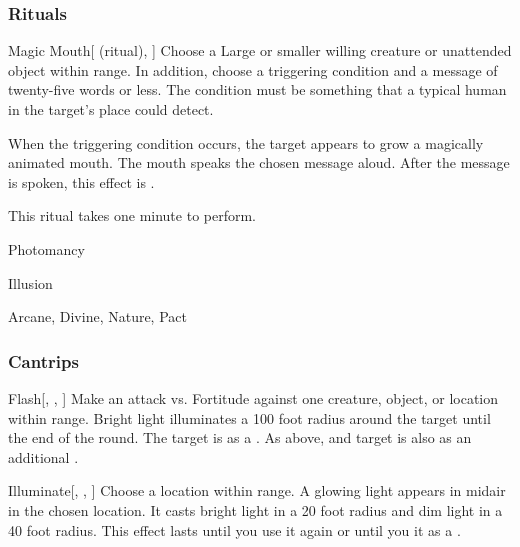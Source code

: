\subsubsection{Rituals}


\lowercase{\hypertarget{spell:Magic Mouth}{}}\label{spell:Magic Mouth}
\begin{attuneability}[\nth{1}]{\hypertarget{spell:Magic Mouth}{Magic Mouth}}[ (ritual), ]
Choose a Large or smaller willing creature or unattended object within \rngclose range.
In addition, choose a triggering condition and a message of twenty-five words or less.
The condition must be something that a typical human in the target's place could detect.

When the triggering condition occurs, the target appears to grow a magically animated mouth.
The mouth speaks the chosen message aloud.
After the message is spoken, this effect is .

This ritual takes one minute to perform.
\end{attuneability}
\vspace{0.25em}


\newpage
\begin{spellsection}{Photomancy}

\begin{spellheader}
\end{spellheader}


 Illusion

 Arcane, Divine, Nature, Pact

\subsubsection{Cantrips}


\begin{freeability}{Flash}[, , ]
Make an attack vs. Fortitude against one creature, object, or location within \rngmed range.
Bright light illuminates a 100 foot radius around the target until the end of the round.
\hit The target is \dazzled as a .
\crit As above, and target is also \dazed as an additional .
\end{freeability}


\begin{freeability}{Illuminate}[, , ]
Choose a location within \rngmed range.
A glowing light appears in midair in the chosen location.
It casts bright light in a 20 foot radius and dim light in a 40 foot radius.
This effect lasts until you use it again or until you  it as a .
\end{freeability}

\end{spellsection}


